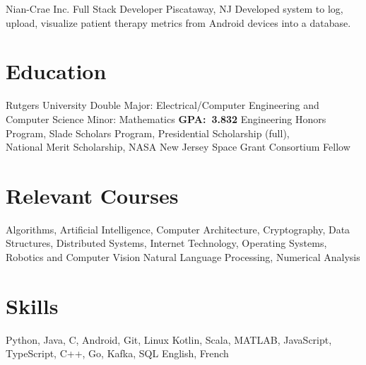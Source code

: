 \documentclass[11pt,letterpaper]{moderncv}
\begin{document}
        {Nian-Crae Inc.}
        {Full Stack Developer}
        {Piscataway, NJ}
        {}
        {Developed system to log, upload, visualize patient therapy metrics from Android devices into a database.\\}


\section{Education}

    {Rutgers University}
    {Double Major: Electrical/Computer Engineering and Computer Science}
    {Minor: Mathematics}
    {\textbf{GPA:~3.832}}
    {Engineering Honors Program, Slade Scholars Program, Presidential Scholarship (full),\\National Merit Scholarship, NASA New Jersey Space Grant Consortium Fellow}


\section{Relevant Courses}
       {Algorithms, Artificial Intelligence, Computer Architecture, Cryptography, Data Structures, Distributed Systems, Internet Technology, Operating Systems, Robotics and Computer Vision
       }
       {Natural Language Processing, Numerical Analysis}

\section{Skills}
       {Python, Java, C, Android, Git, Linux}
       {Kotlin, Scala, MATLAB, JavaScript, TypeScript, C++, Go, Kafka, SQL}
       {English, French}


 
\end{document}
